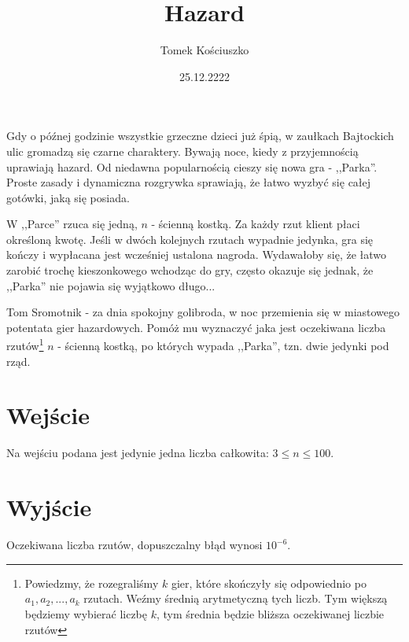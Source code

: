 \documentclass[zad,zawodnik,utf8]{sinol}
\title{Hazard}
\author{Tomek Kościuszko}
\date{25.12.2222}
\begin{document}
\begin{tasktext}%
    Gdy o późnej godzinie wszystkie grzeczne dzieci już śpią, w zaułkach Bajtockich ulic gromadzą się czarne charaktery. Bywają noce, kiedy z przyjemnością uprawiają hazard. Od niedawna popularnością cieszy się nowa gra - ,,Parka''. Proste zasady i dynamiczna rozgrywka sprawiają, że łatwo wyzbyć się całej gotówki, jaką się posiada.

    W ,,Parce'' rzuca się jedną, $n$ - ścienną kostką. Za każdy rzut klient płaci określoną kwotę. Jeśli w dwóch kolejnych rzutach wypadnie jedynka, gra się kończy i wypłacana jest wcześniej ustalona nagroda. Wydawałoby się, że łatwo zarobić trochę kieszonkowego wchodząc do gry, często okazuje się jednak, że ,,Parka'' nie pojawia się wyjątkowo długo...

    Tom Sromotnik - za dnia spokojny golibroda, w noc przemienia się w miastowego potentata gier hazardowych. Pomóż mu wyznaczyć jaka jest oczekiwana liczba rzutów\footnote{Powiedzmy, że rozegraliśmy $k$ gier, które skończyły się odpowiednio po $a_{1}, a_{2}, ..., a_{k}$ rzutach. Weźmy średnią arytmetyczną tych liczb. Tym większą będziemy wybierać liczbę $k$, tym średnia będzie bliższa oczekiwanej liczbie rzutów} $n$ - ścienną kostką, po których wypada ,,Parka'', tzn. dwie jedynki pod rząd.

\section{Wejście}
    Na wejściu podana jest jedynie jedna liczba całkowita: $3 \leq n \leq 100$.

\section{Wyjście}
    Oczekiwana liczba rzutów, dopuszczalny błąd wynosi $10^{-6}$.




\end{tasktext}
\end{document}

